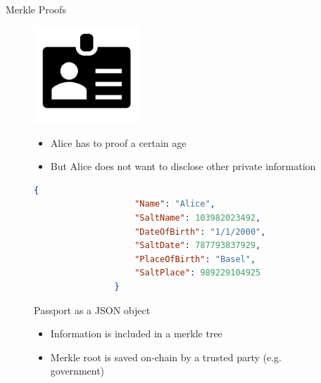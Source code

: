 \documentclass[handout]{beamer}
\begin{document}
\begin{frame}[fragile]{Merkle Proofs}
	\begin{figure}
		\begin{minipage}[h]{0.55\linewidth}
			\centering
			\includegraphics[width=4cm]{../assets/images/id.PNG}
		\end{minipage}%
		\hfill
		\begin{minipage}[h]{0.45\linewidth}
			\begin{itemize}
				\item<1 ->Alice has to proof a certain age
				\item<1 ->But Alice does not want to disclose other private information
			\end{itemize}
		\end{minipage}
	\end{figure}
	\vspace{-0.5cm}
	\begin{figure}
		\begin{minipage}[h]{0.55\linewidth}
			\begin{lstlisting}[language=json,firstnumber=1]
				{
					"Name": "Alice",
					"SaltName": 103982023492,
					"DateOfBirth": "1/1/2000",
					"SaltDate": 787793837929,
					"PlaceOfBirth": "Basel",
					"SaltPlace": 989229104925
				}
			\end{lstlisting}
			\centering
			\scriptsize{Passport as a JSON object}
		\end{minipage}%
		\hfill
		\begin{minipage}[h]{0.45\linewidth}
			\begin{itemize}
				\item<2 ->Information is included in a merkle tree
				\item<2 ->Merkle root is saved on-chain by a trusted party (e.g. government)
			\end{itemize}
		\end{minipage}
	\end{figure}

\end{frame}

\end{document}

